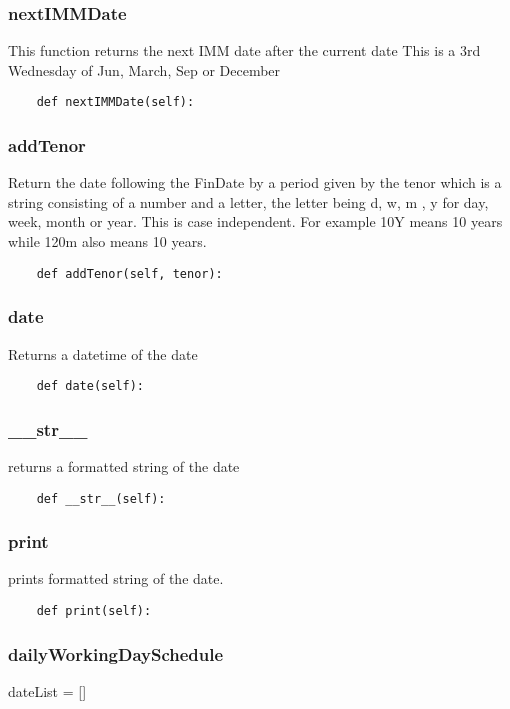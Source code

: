 \documentclass[twoside,11pt]{book}
\begin{document}
\subsubsection*{{\bf nextIMMDate}}
This function returns the next IMM date after the current date This is a 3rd Wednesday of Jun, March, Sep or December  

\begin{lstlisting}
    def nextIMMDate(self):
\end{lstlisting}

\subsubsection*{{\bf addTenor}}
Return the date following the FinDate by a period given by the tenor which is a string consisting of a number and a letter, the letter being d, w, m , y for day, week, month or year. This is case independent. For example 10Y means 10 years while 120m also means 10 years.  

\begin{lstlisting}
    def addTenor(self, tenor):
\end{lstlisting}

\subsubsection*{{\bf date}}
Returns a datetime of the date  

\begin{lstlisting}
    def date(self):
\end{lstlisting}

\subsubsection*{{\bf \_\_str\_\_}}
returns a formatted string of the date  

\begin{lstlisting}
    def __str__(self):
\end{lstlisting}

\subsubsection*{{\bf print}}
prints formatted string of the date.  

\begin{lstlisting}
    def print(self):
\end{lstlisting}

\subsubsection*{{\bf dailyWorkingDaySchedule}}
dateList = [] 
\end{document}

